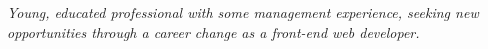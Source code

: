 
\vspace{-1.3em} %

\begin{multicols}{2}  %
\noindent \textit{Young, educated professional with some management experience, seeking new opportunities through a career change as a front-end web developer.}\\\\







\end{multicols}

